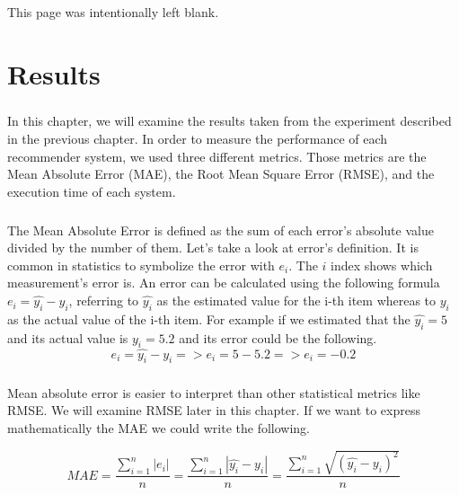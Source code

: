 \newpage
\begin{center}
	This page was intentionally left blank.
\end{center}
\newpage
\chapter{Results}

\paragraph{} In this chapter, we will examine the results taken from the experiment described in the previous chapter. 
In order to measure the performance of each recommender system, we used three different metrics. Those metrics are the Mean Absolute Error (MAE), the Root Mean Square Error (RMSE), and the execution time of each system.

\paragraph{} The Mean Absolute Error is defined as the sum of each error's absolute value divided by the number of them. Let's take a look
at error's definition. It is common in statistics to symbolize the error with $e_i$. The $i$ index shows which measurement's error is. An error can be calculated using the following formula $e_i = \widehat{y_i} - y_i$, referring to $\widehat{y_{i}}$ as the estimated value for the i-th item whereas to $y_i$ as the actual value of the i-th item. For example if we estimated that the $\widehat{y_i} = 5$ and its actual value is $y_i = 5.2$ and its error could be the following.
\begin{equation}
e_i = \widehat{y_i} - y_i => e_i = 5 - 5.2  => e_i = -0.2
\end{equation}

\paragraph{} Mean absolute error is easier to interpret than other statistical metrics like RMSE. We will examine RMSE later in this chapter. If we want to express mathematically the MAE we could write the following.

\begin{equation}
MAE = \frac{\sum_{i=1}^{n}{|e_i|}}{n} =
\frac{\sum_{i=1}^{n}{|\widehat{y_{i}}-y_{i}|} }{n} =
\frac{\sum_{i=1}^{n}\sqrt{{(\widehat{y_{i}}-y_{i})}^{2}}}{n}
\end{equation}

